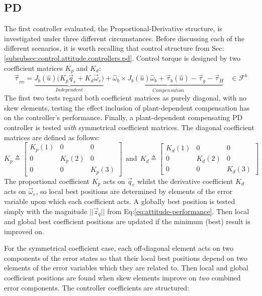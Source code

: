 \subsection{PD}
\label{subsec:simulation.attitude.pd}
The first controller evaluated, the Proportional-Derivative structure, is investigated under three different circumstances. Before discussing each of the different scenarios, it is worth recalling that control structure from Sec:\ref{subsubsec:control.attitude.controllers.pd}. Control torque is designed by two coefficient matrices $K_p$ and $K_d$:
\begin{equation}\label{eq:simulation-attitde-pd}
\vec{\tau}_{_{PD}}=\underbrace{J_b(\hat{u})\big(K_p\vec{q}_e+K_d\vec{\omega}_e\big)}_{Independent}+\underbrace{\hat{\omega}_b\times J_b(\hat{u})\hat{\omega}_b+\vec{\tau}_b(\hat{u})-\vec{\tau}_g-\vec{\tau}_H}_{Compensation}~~~~\in\mathcal{F}^{b}
\end{equation}
The first two tests regard both coefficient matrices as purely diagonal, with no skew elements, testing the effect inclusion of plant-dependent compensation has on the controller's performance. Finally, a plant-dependent compensating PD controller is tested \emph{with} symmetrical coefficient matrices. The diagonal coefficient matrices are defined as follows:
\begin{equation}\label{eq:simulation-attitde-pd-diagonal-coefficients}
K_p\triangleq \begin{bmatrix}
K_p(1) & 0 & 0\\
0 & K_p(2) & 0\\
0 & 0 & K_p(3)
\end{bmatrix}
~~\text{and}~~K_d\triangleq \begin{bmatrix}
K_d(1) & 0 & 0\\
0 & K_d(2) & 0\\
0 & 0 & K_d(3)
\end{bmatrix}
\end{equation}
The proportional coefficient $K_p$ acts on $\vec{q}_e$ whilst the derivative coefficient $K_d$ acts on $\vec{\omega}_e$, so local best positions are determined by elements of the error variable upon which each coefficient acts. A globally best position is tested simply with the magnitude $||\vec{z}_q||$ from Eq:\ref{eq:attitude-performance}. Then local and global best coefficient positions are updated if the minimum (best) result is improved on. 
\par
For the symmetrical coefficient case, each off-diagonal element acts on two components of the error states so that their local best positions depend on two elements of the error variables which they are related to. Then local and global coefficient positions are found when skew elements improve on \emph{two} combined error components. The  controller coefficients are structured:
